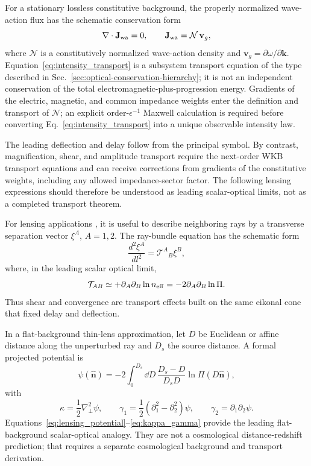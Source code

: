 \documentclass[12pt]{article}
\begin{document}
For a stationary lossless constitutive background, the properly normalized wave-action flux has the schematic conservation form
\begin{equation}
 \nabla\cdot\mathbf J_{\rm wa}=0,
 \qquad
 \mathbf J_{\rm wa}=\mathcal N\,\mathbf v_g,
\label{eq:intensity_transport}
\end{equation}
where \(\mathcal N\) is a constitutively normalized wave-action density and \(\mathbf v_g=\partial\omega/\partial\mathbf k\).  Equation~\eqref{eq:intensity_transport} is a subsystem transport equation of the type described in Sec.~\ref{sec:optical-conservation-hierarchy}; it is not an independent conservation of the total electromagnetic-plus-progression energy.  Gradients of the electric, magnetic, and common impedance weights enter the definition and transport of \(\mathcal N\); an explicit order-\(\epsilon^{-1}\) Maxwell calculation is required before converting Eq.~\eqref{eq:intensity_transport} into a unique observable intensity law.

The leading deflection and delay follow from the principal symbol.  By contrast, magnification, shear, and amplitude transport require the next-order WKB transport equations and can receive corrections from gradients of the constitutive weights, including any allowed impedance-sector factor.  The following lensing expressions should therefore be understood as leading scalar-optical limits, not as a completed transport theorem.

For lensing applications \cite{SchneiderEhlersFalco1992,BartelmannSchneider2001,Perlick2004}, it is useful to describe neighboring rays by a transverse separation vector $\xi^A$, $A=1,2$.  The ray-bundle equation has the schematic form
\begin{equation}
 \frac{d^2\xi^A}{dl^2}
 =\mathcal T^A{}_{B}\xi^B,
\label{eq:jacobi}
\end{equation}
where, in the leading scalar optical limit,
\begin{equation}
 \mathcal T_{AB}\simeq +\partial_A\partial_B\ln n_{\rm eff}
 =-2\partial_A\partial_B\ln\Pi.
\label{eq:optical_tidal}
\end{equation}
Thus shear and convergence are transport effects built on the same eikonal cone that fixed delay and deflection.

In a flat-background thin-lens approximation, let \(D\) be Euclidean or affine distance along the unperturbed ray and \(D_s\) the source distance.  A formal projected potential is
\begin{equation}
 \psi(\hat{\mathbf n})
 =-2\int_0^{D_s}\dd D\,
 \frac{D_s-D}{D_sD}
 \ln\Pi(D\hat{\mathbf n}),
\label{eq:lensing_potential}
\end{equation}
with
\begin{equation}
 \kappa=\frac12\nabla_\perp^2\psi,
 \qquad
 \gamma_1=\frac12(\partial_1^2-\partial_2^2)\psi,
 \qquad
 \gamma_2=\partial_1\partial_2\psi.
\label{eq:kappa_gamma}
\end{equation}
Equations~\eqref{eq:lensing_potential}--\eqref{eq:kappa_gamma} provide the leading flat-background scalar-optical analogy.  They are not a cosmological distance-redshift prediction; that requires a separate cosmological background and transport derivation.
\end{document}
